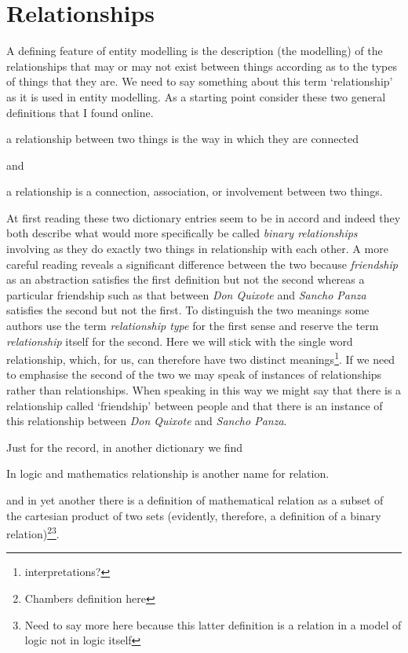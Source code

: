 
\section{Relationships}
\label{Relationships}
\mynote
A defining feature of entity modelling is the description
 (the modelling) of the relationships that may or may not  exist between things according as to the types of things that they are. 
\mynote 
We need to say something about this term `relationship' as it is used in
entity modelling.
As a starting point consider these two general definitions that I found online. 

\begin{erquote}
a relationship between two things is the way in which they are connected
\end{erquote}
and 
\begin{erquote}
a relationship is a connection, association, or involvement between two things.
\end{erquote}

At first reading these two dictionary entries seem to be in accord and indeed 
they both describe what would more specifically be called \textit{binary relationships} involving as they do exactly two things in relationship with each other.
A more careful reading reveals a significant difference between the two because \textit{friendship} as an abstraction satisfies the first definition but not the second whereas a particular friendship such as that between \textit{Don Quixote} and \textit{Sancho Panza} satisfies the second  but not the first. 
To distinguish the two meanings some authors use the term \textit{relationship type} for the first sense and reserve the term \textit{relationship} itself for the second. Here we will stick with the single word relationship, which, for us, can therefore have two distinct meanings\footnote{interpretations?}. If we need to emphasise the second of the two we may speak of instances of relationships rather than relationships. When speaking in this way we might say that there is a relationship called `friendship' between people and that there is an instance of this relationship between \textit{Don Quixote} and \textit{Sancho Panza}.

\mynote
Just for the record, in another dictionary we find 
\begin{erquote}
In logic and mathematics relationship is another name for relation.
\end{erquote}
and in yet another there is a definition of mathematical relation as a subset of the cartesian product of two sets 
(evidently, therefore, a definition of a binary relation)\footnote{Chambers definition here}\footnote{Need to say more here because this latter definition is a relation in a model of logic not in logic itself}. 

